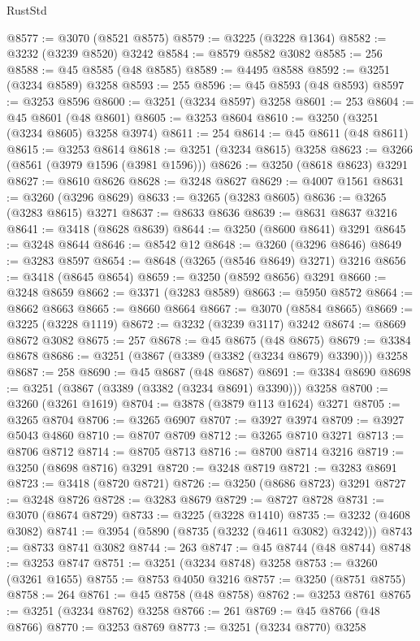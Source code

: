 \begin{lexlean}{RustStd}
\begin{coremodule}
@8577 := @3070 (@8521 @8575)
@8579 := @3225 (@3228 @1364)
@8582 := @3232 (@3239 @8520) @3242
@8584 := @8579 @8582 @3082
@8585 := 256
@8588 := @45 @8585 (@48 @8585)
@8589 := @4495 @8588
@8592 := @3251 (@3234 @8589) @3258
@8593 := 255
@8596 := @45 @8593 (@48 @8593)
@8597 := @3253 @8596
@8600 := @3251 (@3234 @8597) @3258
@8601 := 253
@8604 := @45 @8601 (@48 @8601)
@8605 := @3253 @8604
@8610 := @3250 (@3251 (@3234 @8605) @3258 @3974)
@8611 := 254
@8614 := @45 @8611 (@48 @8611)
@8615 := @3253 @8614
@8618 := @3251 (@3234 @8615) @3258
@8623 := @3266 (@8561 (@3979 @1596 (@3981 @1596)))
@8626 := @3250 (@8618 @8623) @3291
@8627 := @8610 @8626
@8628 := @3248 @8627
@8629 := @4007 @1561
@8631 := @3260 (@3296 @8629)
@8633 := @3265 (@3283 @8605)
@8636 := @3265 (@3283 @8615) @3271
@8637 := @8633 @8636
@8639 := @8631 @8637 @3216
@8641 := @3418 (@8628 @8639)
@8644 := @3250 (@8600 @8641) @3291
@8645 := @3248 @8644
@8646 := @8542 @12
@8648 := @3260 (@3296 @8646)
@8649 := @3283 @8597
@8654 := @8648 (@3265 (@8546 @8649) @3271) @3216
@8656 := @3418 (@8645 @8654)
@8659 := @3250 (@8592 @8656) @3291
@8660 := @3248 @8659
@8662 := @3371 (@3283 @8589)
@8663 := @5950 @8572
@8664 := @8662 @8663
@8665 := @8660 @8664
@8667 := @3070 (@8584 @8665)
@8669 := @3225 (@3228 @1119)
@8672 := @3232 (@3239 @3117) @3242
@8674 := @8669 @8672 @3082
@8675 := 257
@8678 := @45 @8675 (@48 @8675)
@8679 := @3384 @8678
@8686 := @3251 (@3867 (@3389 (@3382 (@3234 @8679) @3390))) @3258
@8687 := 258
@8690 := @45 @8687 (@48 @8687)
@8691 := @3384 @8690
@8698 := @3251 (@3867 (@3389 (@3382 (@3234 @8691) @3390))) @3258
@8700 := @3260 (@3261 @1619)
@8704 := @3878 (@3879 @113 @1624) @3271
@8705 := @3265 @8704
@8706 := @3265 @6907
@8707 := @3927 @3974
@8709 := @3927 @5043 @4860
@8710 := @8707 @8709
@8712 := @3265 @8710 @3271
@8713 := @8706 @8712
@8714 := @8705 @8713
@8716 := @8700 @8714 @3216
@8719 := @3250 (@8698 @8716) @3291
@8720 := @3248 @8719
@8721 := @3283 @8691
@8723 := @3418 (@8720 @8721)
@8726 := @3250 (@8686 @8723) @3291
@8727 := @3248 @8726
@8728 := @3283 @8679
@8729 := @8727 @8728
@8731 := @3070 (@8674 @8729)
@8733 := @3225 (@3228 @1410)
@8735 := @3232 (@4608 @3082)
@8741 := @3954 (@5890 (@8735 (@3232 (@4611 @3082) @3242)))
@8743 := @8733 @8741 @3082
@8744 := 263
@8747 := @45 @8744 (@48 @8744)
@8748 := @3253 @8747
@8751 := @3251 (@3234 @8748) @3258
@8753 := @3260 (@3261 @1655)
@8755 := @8753 @4050 @3216
@8757 := @3250 (@8751 @8755)
@8758 := 264
@8761 := @45 @8758 (@48 @8758)
@8762 := @3253 @8761
@8765 := @3251 (@3234 @8762) @3258
@8766 := 261
@8769 := @45 @8766 (@48 @8766)
@8770 := @3253 @8769
@8773 := @3251 (@3234 @8770) @3258

\end{coremodule}
\end{lexlean}
